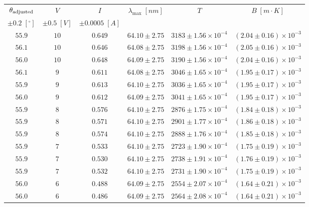 \documentclass[12pt]{article}
\begin{document}
\begin{table}[htbp]
    \centering
    \vspace{10pt}
    \begin{tabular}{cccccc}
        \toprule
        $\theta_{\rm adjusted}$ & $V$ & $I$ & $\lambda_{\text{max}}\;[nm]$ & $T$\;[K]& $B\;[m\cdot K]$\\
        $\pm0.2\;[^\circ]$&$\pm0.5\;[V]$&$\pm0.0005\;[A]$& & & &\\
        \midrule
        $55.9$ & $10$ & $0.649$ & $64.10 \pm 2.75$ & $3183 \pm 1.56 \times 10^{-4}$ & $(2.04 \pm 0.16) \times 10^{-3}$ \\
        $56.1$ & $10$ & $0.646$ & $64.08 \pm 2.75$ & $3198 \pm 1.56 \times 10^{-4}$ & $(2.05 \pm 0.16) \times 10^{-3}$ \\
        $56.0$ & $10$ & $0.648$ & $64.09 \pm 2.75$ & $3190 \pm 1.56 \times 10^{-4}$ & $(2.04 \pm 0.16) \times 10^{-3}$ \\
        $56.1$ & $9$ & $0.611$ & $64.08 \pm 2.75$ & $3046 \pm 1.65 \times 10^{-4}$ & $(1.95 \pm 0.17) \times 10^{-3}$ \\
        $55.9$ & $9$ & $0.613$ & $64.10 \pm 2.75$ & $3036 \pm 1.65 \times 10^{-4}$ & $(1.95 \pm 0.17) \times 10^{-3}$ \\
        $56.0$ & $9$ & $0.612$ & $64.09 \pm 2.75$ & $3041 \pm 1.65 \times 10^{-4}$ & $(1.95 \pm 0.17) \times 10^{-3}$ \\
        $55.9$ & $8$ & $0.576$ & $64.10 \pm 2.75$ & $2876 \pm 1.75 \times 10^{-4}$ & $(1.84 \pm 0.18) \times 10^{-3}$ \\
        $55.9$ & $8$ & $0.571$ & $64.10 \pm 2.75$ & $2901 \pm 1.77 \times 10^{-4}$ & $(1.86 \pm 0.18) \times 10^{-3}$ \\
        $55.9$ & $8$ & $0.574$ & $64.10 \pm 2.75$ & $2888 \pm 1.76 \times 10^{-4}$ & $(1.85 \pm 0.18) \times 10^{-3}$ \\
        $55.9$ & $7$ & $0.533$ & $64.10 \pm 2.75$ & $2723 \pm 1.90 \times 10^{-4}$ & $(1.75 \pm 0.19) \times 10^{-3}$ \\
        $55.9$ & $7$ & $0.530$ & $64.10 \pm 2.75$ & $2738 \pm 1.91 \times 10^{-4}$ & $(1.76 \pm 0.19) \times 10^{-3}$ \\
        $55.9$ & $7$ & $0.532$ & $64.10 \pm 2.75$ & $2731 \pm 1.90 \times 10^{-4}$ & $(1.75 \pm 0.19) \times 10^{-3}$ \\
        $56.0$ & $6$ & $0.488$ & $64.09 \pm 2.75$ & $2554 \pm 2.07 \times 10^{-4}$ & $(1.64 \pm 0.21) \times 10^{-3}$ \\
        $56.0$ & $6$ & $0.486$ & $64.09 \pm 2.75$ & $2564 \pm 2.08 \times 10^{-4}$ & $(1.64 \pm 0.21) \times 10^{-3}$ \\

\end{tabular}
\end{table}
\end{document}
